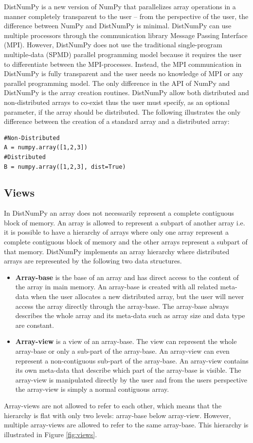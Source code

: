 \documentclass{acm_proc_article-sp}
\begin{document}
DistNumPy is a new version of NumPy that parallelizes array operations in a manner completely transparent to the user -- from the perspective of the user, the difference between NumPy and DistNumPy is minimal. DistNumPy can use multiple processors through the communication library Message Passing Interface (MPI)\cite{mpi}. However, DistNumPy does not use the traditional single-program multiple-data (SPMD) parallel programming model because it requires the user to differentiate between the MPI-processes. Instead, the MPI communication in DistNumPy is fully transparent and the user needs no knowledge of MPI or any parallel programming model. 
The only difference in the API of NumPy and DistNumPy is the array creation routines. DistNumPy allow both distributed and non-distributed arrays to co-exist thus the user must specify, as an optional parameter, if the array should be distributed. The following illustrates the only difference between the creation of a standard array and a distributed array:
\lstset{frame=none, xleftmargin=0mm, numbers=none}
\begin{lstlisting}
#Non-Distributed
A = numpy.array([1,2,3])
#Distributed
B = numpy.array([1,2,3], dist=True)
\end{lstlisting}
\lstset{frame=single, xleftmargin=5mm, numbers=left}

\subsection{Views}
In DistNumPy an array does not necessarily represent a complete contiguous block of memory. An array is allowed to represent a subpart of another array i.e. it is possible to have a hierarchy of arrays where only one array represent a complete contiguous block of memory and the other arrays represent a subpart of that memory. DistNumPy implements an array hierarchy where distributed arrays are represented by the following two data structures.
\begin{itemize}
\item \textbf{Array-base} is the base of an array and has direct access to the content of the array in main memory. An array-base is created with all related meta-data when the user allocates a new distributed array, but the user will never access the array directly through the array-base. The array-base always describes the whole array and its meta-data such as array size and data type are constant.
\item \textbf{Array-view} is a view of an array-base. The view can represent the whole array-base or only a sub-part of the array-base. An array-view can even represent a non-contiguous sub-part of the array-base. An array-view contains its own meta-data that describe which part of the array-base is visible. The array-view is manipulated directly by the user and from the users perspective the array-view is simply a normal contiguous array.
\end{itemize}
Array-views are not allowed to refer to each other, which means that the hierarchy is flat with only two levels: array-base below array-view. However, multiple array-views are allowed to refer to the same array-base. This hierarchy is illustrated in Figure \ref{fig:views}. 
\end{document}
